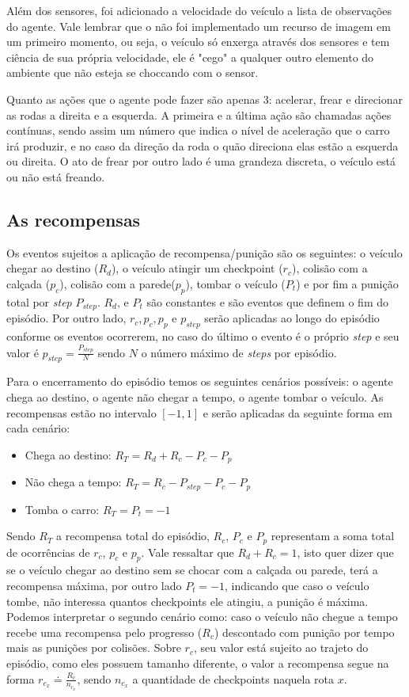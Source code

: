  Além dos sensores, foi adicionado a velocidade do veículo a lista de observações do agente. Vale lembrar que o não foi implementado um recurso de imagem em um primeiro momento, ou seja, o veículo só enxerga através dos sensores e tem ciência de sua própria velocidade, ele é "cego" a qualquer outro elemento do ambiente que não esteja se choccando com o sensor.

 Quanto as ações que o agente pode fazer são apenas 3: acelerar, frear e direcionar as rodas a direita e a esquerda. A primeira e a última ação são chamadas ações contínuas, sendo assim um número que indica o nível de aceleração que o carro irá produzir, e no caso da direção da roda o quão direciona elas estão a esquerda ou direita. O ato de frear por outro lado é uma grandeza discreta, o veículo está ou não está freando.

\subsection{As recompensas}
Os eventos sujeitos a aplicação de recompensa/punição são os seguintes: o veículo chegar ao destino ($R_d$), o veículo atingir um checkpoint ($r_c$), colisão com a calçada ($p_c$), colisão com a parede($p_p$), tombar o veículo ($P_t$) e por fim a punição total por \textit{step} $P_{step}$. $R_d$, e $P_t$ são constantes e são eventos que definem o fim do episódio. Por outro lado, $r_c, p_c, p_p \text{ e } p_{step}$ serão aplicadas ao longo do episódio conforme os eventos ocorrerem, no caso do último o evento é o próprio \textit{step} e seu valor é $p_{step} = \frac{P_{step}}{N}$ sendo $N$ o número máximo de \textit{steps} por episódio.

Para o encerramento do episódio temos os seguintes cenários possíveis: o agente chega ao destino, o agente não chegar a tempo, o agente tombar o veículo. As recompensas estão no intervalo $[-1,1]$ e serão aplicadas da seguinte forma em cada cenário:

\begin{itemize}
   \item Chega ao destino: $R_T = R_d + R_c - P_c - P_p$
   \item Não chega a tempo: $R_T = R_c - P_{step} - P_c - P_p$
   \item Tomba o carro: $R_T = P_t = -1$
\end{itemize}

Sendo $R_T$ a recompensa total do episódio, $R_c$, $P_c$ e $P_p$ representam a soma total de ocorrências de $r_c$, $p_c$ e $p_p$. Vale ressaltar que $R_d + R_c = 1$, isto quer dizer que se o veículo chegar ao destino sem se chocar com a calçada ou parede, terá a recompensa máxima, por outro lado $P_t = -1$, indicando que caso o veículo tombe, não interessa quantos checkpoints ele atingiu, a punição é máxima. Podemos interpretar o segundo cenário como: caso o veículo não chegue a tempo recebe uma recompensa pelo progresso ($R_c$) descontado com punição por tempo mais as punições por colisões. Sobre $r_c$, seu valor está sujeito ao trajeto do episódio, como eles possuem tamanho diferente, o valor a recompensa segue na forma $r_{c_x} \doteq \frac{R_c}{n_{c_x}}$, sendo $n_{c_x}$ a quantidade de checkpoints naquela rota $x$.

